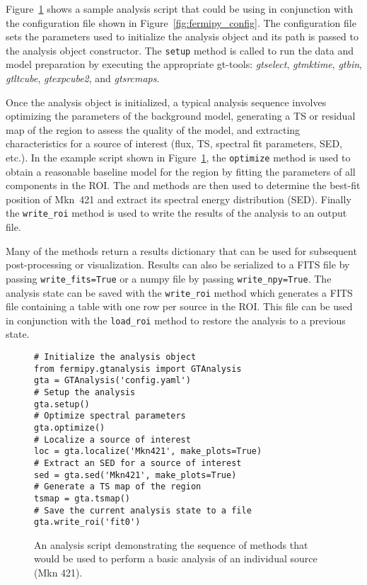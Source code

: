 \documentclass{PoS}
\begin{document}

Figure~\ref{fig:fermipy_script} shows a sample analysis script that
could be using in conjunction with the configuration file shown in
Figure~\ref{fig:fermipy_config}.  The configuration file sets the
parameters used to initialize the analysis object and its path is
passed to the analysis object constructor.  The \lstinline$setup$
method is called to run the data and model preparation by executing
the appropriate gt-tools: \emph{gtselect}, \emph{gtmktime},
\emph{gtbin}, \emph{gtltcube}, \emph{gtexpcube2}, and
\emph{gtsrcmaps}.


Once the analysis object is initialized, a typical analysis sequence
involves optimizing the parameters of the background model, generating
a TS or residual map of the region to assess the quality of the model,
and extracting characteristics for a source of interest (flux, TS,
spectral fit parameters, SED, etc.).  In the example script shown in
Figure~\ref{fig:fermipy_script}, the \lstinline$optimize$ method is
used to obtain a reasonable baseline model for the region by fitting
the parameters of all components in the ROI.  The {\localize} and
{\sed} methods are then used to determine the best-fit position of
Mkn~421 and extract its spectral energy distribution (SED).  Finally
the \lstinline$write_roi$ method is used to write the results of the
analysis to an output file.

Many of the {\fermipy} methods return a results dictionary that can be
used for subsequent post-processing or visualization.  Results can
also be serialized to a FITS file by passing
\lstinline$write_fits=True$ or a numpy file by passing
\lstinline$write_npy=True$.  The analysis state can be saved with the
\lstinline$write_roi$ method which generates a FITS file containing a
table with one row per source in the ROI.  This file can be used in
conjunction with the \lstinline$load_roi$ method to restore the
analysis to a previous state.



\smallskip
\begin{figure}[t]
\begin{lstlisting}
# Initialize the analysis object
from fermipy.gtanalysis import GTAnalysis
gta = GTAnalysis('config.yaml')
# Setup the analysis
gta.setup()
# Optimize spectral parameters
gta.optimize()
# Localize a source of interest
loc = gta.localize('Mkn421', make_plots=True)
# Extract an SED for a source of interest
sed = gta.sed('Mkn421', make_plots=True)
# Generate a TS map of the region
tsmap = gta.tsmap()
# Save the current analysis state to a file
gta.write_roi('fit0')
\end{lstlisting}
  \caption{An analysis script demonstrating the sequence of methods
    that would be used to perform a basic analysis of an individual
    source (Mkn 421).\label{fig:fermipy_script}}
\end{figure}
\end{document}
